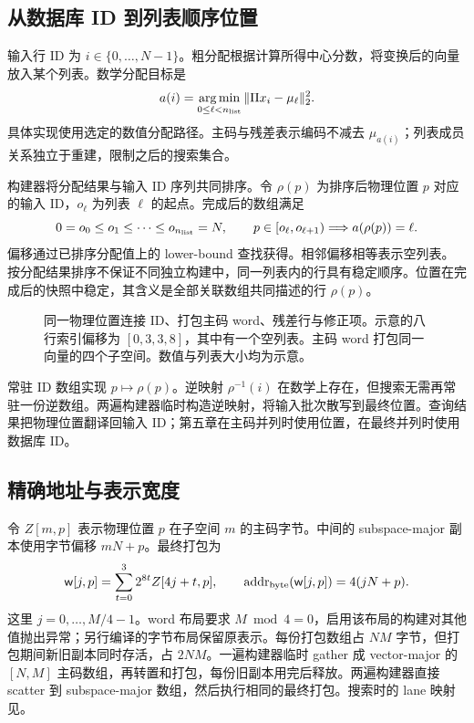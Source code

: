 \subsection{从数据库 ID 到列表顺序位置}

输入行 ID 为 $i\in\{0,\ldots,N-1\}$。粗分配根据计算所得中心分数，将变换后的向量放入某个列表。数学分配目标是
\begin{equation}
 a(i)=\operatorname*{arg\,min}_{0\leq\ell<n_{\rm list}}
       \|\Pi x_i-\mu_\ell\|_2^2.
 \label{eq:4-assignment}
\end{equation}
具体实现使用选定的数值分配路径。主码与残差表示编码不减去 $\mu_{a(i)}$；列表成员关系独立于重建，限制之后的搜索集合。

构建器将分配结果与输入 ID 序列共同排序。令 $\rho(p)$ 为排序后物理位置 $p$ 对应的输入 ID，$o_\ell$ 为列表 $\ell$ 的起点。完成后的数组满足
\begin{equation}
 0=o_0\leq o_1\leq\cdots\leq o_{n_{\rm list}}=N,
 \qquad p\in[o_\ell,o_{\ell+1})\Longrightarrow a(\rho(p))=\ell.
 \label{eq:4-offsets}
\end{equation}
偏移通过已排序分配值上的 lower-bound 查找获得。相邻偏移相等表示空列表。按分配结果排序不保证不同独立构建中，同一列表内的行具有稳定顺序。位置在完成后的快照中稳定，其含义是全部关联数组共同描述的行 $\rho(p)$。

\begin{figure}[tbp]
\centering

\caption[按列表排列的物理索引布局]{同一物理位置连接 ID、打包主码 word、残差行与修正项。示意的八行索引偏移为 $[0,3,3,8]$，其中有一个空列表。主码 word 打包同一向量的四个子空间。数值与列表大小均为示意。}
\label{fig:4-layout}
\end{figure}

常驻 ID 数组实现 $p\mapsto\rho(p)$。逆映射 $\rho^{-1}(i)$ 在数学上存在，但搜索无需再常驻一份逆数组。两遍构建器临时构造逆映射，将输入批次散写到最终位置。查询结果把物理位置翻译回输入 ID；第五章在主码并列时使用位置，在最终并列时使用数据库 ID。

\subsection{精确地址与表示宽度}

令 $Z[m,p]$ 表示物理位置 $p$ 在子空间 $m$ 的主码字节。中间的 subspace-major 副本使用字节偏移 $mN+p$。最终打包为
\begin{equation}
 \mathsf w[j,p]=\sum_{t=0}^{3}2^{8t}Z[4j+t,p],\qquad
 \operatorname{addr}_{\rm byte}(\mathsf w[j,p])=4(jN+p).
 \label{eq:4-primary-address}
\end{equation}
这里 $j=0,\ldots,M/4-1$。word 布局要求 $M\bmod4=0$，启用该布局的构建对其他值抛出异常；另行编译的字节布局保留原表示。每份打包数组占 $NM$ 字节，但打包期间新旧副本同时存活，占 $2NM$。一遍构建器临时 gather 成 vector-major 的 $[N,M]$ 主码数组，再转置和打包，每份旧副本用完后释放。两遍构建器直接 scatter 到 subspace-major 数组，然后执行相同的最终打包。搜索时的 lane 映射见。

